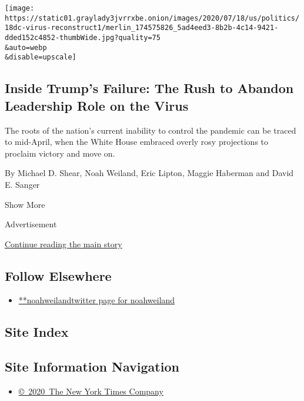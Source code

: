 \begin{enumerate}
  \texttt{[image: https://static01.graylady3jvrrxbe.onion/images/2020/07/18/us/politics/18dc-virus-reconstruct1/merlin\_174575826\_5ad4eed3-8b2b-4c14-9421-dded152c4852-thumbWide.jpg?quality=75\\\&auto=webp\\\&disable=upscale]}

  \hypertarget{inside-trumps-failure-the-rush-to-abandon-leadership-role-on-the-virus}{%
  \subsection{Inside Trump's Failure: The Rush to Abandon Leadership
  Role on the
  Virus}\label{inside-trumps-failure-the-rush-to-abandon-leadership-role-on-the-virus}}

  The roots of the nation's current inability to control the pandemic
  can be traced to mid-April, when the White House embraced overly rosy
  projections to proclaim victory and move on.

  By Michael D. Shear, Noah Weiland, Eric Lipton, Maggie Haberman and
  David E. Sanger
\end{enumerate}

Show More

Advertisement

\protect\hyperlink{after-mid2}{Continue reading the main story}

\hypertarget{follow-elsewhere}{%
\subsection{Follow Elsewhere}\label{follow-elsewhere}}

\begin{itemize}
\tightlist
\item
  \href{https://twitter.com/noahweiland}{**noahweilandtwitter page for
  noahweiland}
\end{itemize}

\hypertarget{site-index}{%
\subsection{Site Index}\label{site-index}}

\hypertarget{site-information-navigation}{%
\subsection{Site Information
Navigation}\label{site-information-navigation}}

\begin{itemize}
\tightlist
\item
  \href{https://help.nytimes3xbfgragh.onion/hc/en-us/articles/115014792127-Copyright-notice}{©~2020~The
  New York Times Company}
\end{itemize}

